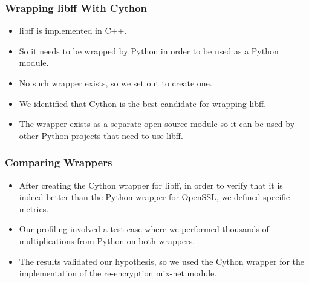 \documentclass{beamer}
\begin{document}
    \begin{frame}
        \frametitle{Wrapping libff With Cython}
        \begin{itemize}
            \item libff is implemented in C++.
            \item So it needs to be wrapped by Python in order to be used as a
            Python module.
            \item No such wrapper exists, so we set out to create one.
            \item We identified that Cython is the best candidate for wrapping
            libff.
            \item The wrapper exists as a separate open source module
            so it can be used by other Python projects that need to use libff.
        \end{itemize}
    \end{frame}

    \begin{frame}
        \frametitle{Comparing Wrappers}
        \begin{itemize}
            \item After creating the Cython wrapper for libff, in order to
            verify that it is indeed better than the Python wrapper for
            OpenSSL, we defined specific metrics.
            \item Our profiling involved a test case where we performed
            thousands of multiplications from Python on both wrappers.
            \item The results validated our hypothesis, so we used the Cython
            wrapper for the implementation of the re-encryption mix-net module.
        \end{itemize}
    \end{frame}

    \begin{frame}
    \end{frame}
\end{document}
